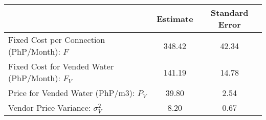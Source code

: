 \begin{tabular}{lcc}
& Estimate & Standard Error \\
\hline
Fixed Cost per Connection (PhP/Month): $F$ &348.42&42.34\\
Fixed Cost for Vended Water (PhP/Month): $F_{V}$ &141.19&14.78\\
Price for Vended Water (PhP/m3): $P_{V}$ &39.80&2.54\\
Vendor Price Variance: $\sigma_{V}^2$  &8.20&0.67\\
\hline
\end{tabular}
